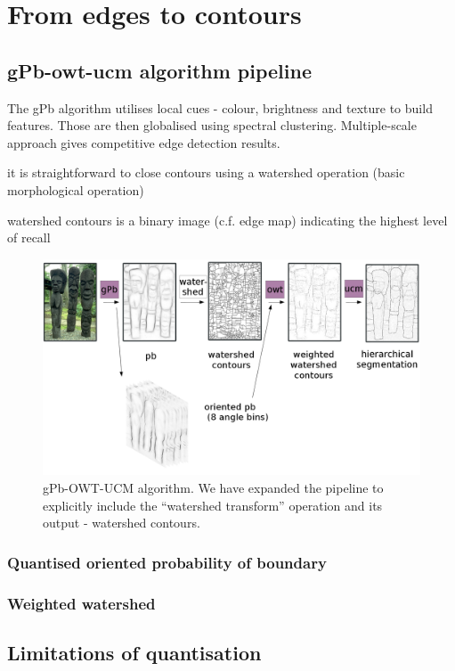 \chapter{From edges to contours} %
\label{Chapter3}
\section{gPb-owt-ucm algorithm pipeline}
The gPb algorithm utilises local cues - colour, brightness and texture to build features. Those are then globalised using spectral clustering. Multiple-scale approach gives competitive edge detection results.

it is straightforward to close contours using a watershed operation (basic morphological operation)

watershed contours is a binary image (c.f. edge map) indicating the highest level of recall

\begin{figure}[ht!]
\centering
 \includegraphics[width=1\textwidth]{images/gPb-OWT-UCM/gPb-OWT-UCM_pipeline.png}
\caption{gPb-OWT-UCM algorithm. We have expanded the pipeline to explicitly include the ``watershed transform'' operation and its output - watershed contours.}
\label{fig:gPb-OWT-UCM-pipeline}
\end{figure}

\subsection{Quantised oriented probability of boundary}
\subsection{Weighted watershed}
\section{Limitations of quantisation} %